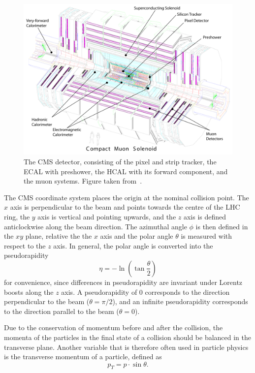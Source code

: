 \begin{figure}[ht]
  \centering
 \includegraphics[width=.9\textwidth]{cms_complete_labelled}
 \caption{The \ac{CMS} detector, consisting of the pixel and strip tracker, the \protect\acf{ECAL} with preshower, the \protect\acf{HCAL} with its forward component, and the muon systems. Figure taken from~\cite{Chatrchyan:2008aa}.}
 \label{fig:CMS}
\end{figure}

The CMS coordinate system places the origin at the nominal collision point. The $x$ axis is perpendicular to the beam and points towards the centre of the \ac{LHC} ring, the $y$ axis is vertical and pointing upwards, and the $z$ axis is defined anticlockwise along the beam direction. The azimuthal angle $\phi$ is then defined in the $xy$ plane, relative the the $x$ axis and the polar angle $\theta$ is measured with respect to the $z$ axis. In general, the polar angle is converted into the pseudorapidity
\begin{equation}
 \eta = -\ln\left(\tan\frac{\theta}{2}\right)
\end{equation}
for convenience, since differences in pseudorapidity are invariant under Lorentz boosts along the $z$ axis. A pseudorapidity of 0 corresponds to the direction perpendicular to the beam ($\theta = \pi/2$), and an infinite pseudorapidity corresponds to the direction parallel to the beam ($\theta = 0$).

Due to the conservation of momentum before and after the collision, the momenta of the particles in the final state of a collision should be balanced in the transverse plane. Another variable that is therefore often used in particle physics is the transverse momentum of a particle, defined as 
\begin{equation}
p_T = p \cdot \sin \theta .
\end{equation}

